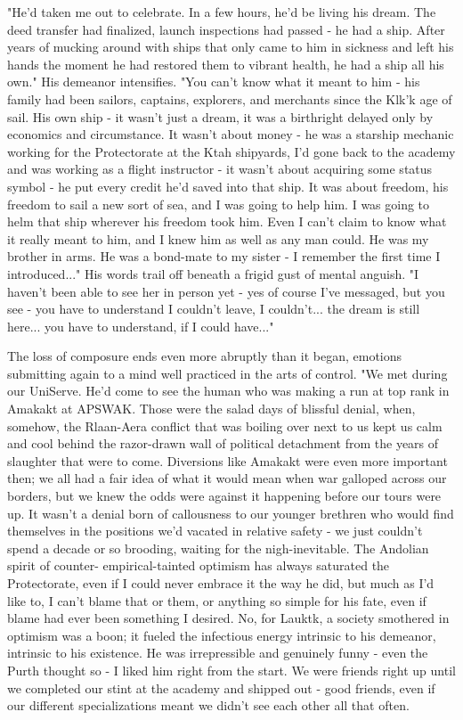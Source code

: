 "He'd taken me out to celebrate. In a few hours, he'd be living his
dream. The deed transfer had finalized, launch inspections had passed
- he had a ship.  After years of mucking around with ships that only
came to him in sickness and left his hands the moment he had restored
them to vibrant health, he had a ship all his own." His demeanor
intensifies. "You can't know what it meant to him - his family had
been sailors, captains, explorers, and merchants since the Klk'k age
of sail. His own ship - it wasn't just a dream, it was a birthright
delayed only by economics and circumstance. It wasn't about money - he
was a starship mechanic working for the Protectorate at the Ktah
shipyards, I'd gone back to the academy and was working as a flight
instructor - it wasn't about acquiring some status symbol - he put
every credit he'd saved into that ship. It was about freedom, his
freedom to sail a new sort of sea, and I was going to help him. I was
going to helm that ship wherever his freedom took him. Even I can't
claim to know what it really meant to him, and I knew him as well as
any man could. He was my brother in arms. He was a bond-mate to my
sister - I remember the first time I introduced..." His words trail
off beneath a frigid gust of mental anguish. "I haven't been able to
see her in person yet - yes of course I've messaged, but you see - you
have to understand I couldn't leave, I couldn't...  the dream is still
here... you have to understand, if I could have..."

The loss of composure ends even more abruptly than it began, emotions
submitting again to a mind well practiced in the arts of control. "We
met during our UniServe. He'd come to see the human who was making a
run at top rank in Amakakt at APSWAK. Those were the salad days of
blissful denial, when, somehow, the Rlaan-Aera conflict that was
boiling over next to us kept us calm and cool behind the razor-drawn
wall of political detachment from the years of slaughter that were to
come. Diversions like Amakakt were even more important then; we all
had a fair idea of what it would mean when war galloped across our
borders, but we knew the odds were against it happening before our
tours were up. It wasn't a denial born of callousness to our younger
brethren who would find themselves in the positions we'd vacated in
relative safety - we just couldn't spend a decade or so brooding,
waiting for the nigh-inevitable. The Andolian spirit of counter-
empirical-tainted optimism has always saturated the Protectorate, even
if I could never embrace it the way he did, but much as I'd like to, I
can't blame that or them, or anything so simple for his fate, even if
blame had ever been something I desired. No, for Lauktk, a society
smothered in optimism was a boon; it fueled the infectious energy
intrinsic to his demeanor, intrinsic to his existence. He was
irrepressible and genuinely funny - even the Purth thought so - I
liked him right from the start. We were friends right up until we
completed our stint at the academy and shipped out - good friends,
even if our different specializations meant we didn't see each other
all that often.

